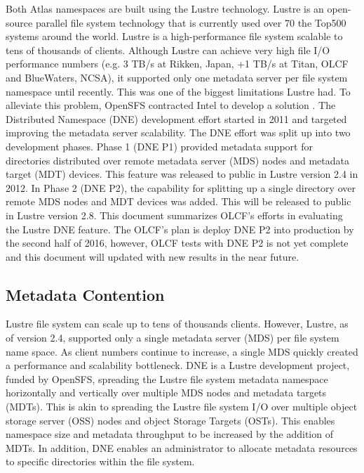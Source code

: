 \documentclass[conference,compsoc]{IEEEtran}
\begin{document}
Both Atlas namespaces are built using the Lustre technology. Lustre is an
open-source parallel file system technology that is currently used over 70%
the Top500 systems around the world. Lustre is a high-performance file system
scalable to tens of thousands of clients. Although Lustre can achieve very high
file I/O performance numbers (e.g. 3 TB/s at Rikken, Japan, +1 TB/s at Titan,
OLCF and BlueWaters, NCSA), it supported only one metadata server per file
system namespace until recently. This was one of the biggest limitations Lustre
had. To alleviate this problem, OpenSFS contracted Intel to develop a solution
\cite{dne-contract}.  The Distributed Namespace (DNE) development effort
started in 2011 and targeted improving the metadata server scalability.  The
DNE effort was split up into two development phases.  Phase 1 (DNE P1) provided
metadata support for directories distributed over remote metadata server (MDS)
nodes and metadata target (MDT) devices. This feature was released to public in
Lustre version 2.4 in 2012. In Phase 2 (DNE P2), the capability for splitting
up a single directory over remote MDS nodes and MDT devices was added. This
will be released to public in Lustre version 2.8.  This document summarizes
OLCF’s efforts in evaluating the Lustre DNE feature. The OLCF’s plan is deploy
DNE P2 into production by the second half of 2016, however, OLCF tests with DNE
P2 is not yet complete and this document will updated with new results in the
near future.

\subsection{Metadata Contention}

Lustre file system can scale up to tens of thousands clients. However, Lustre,
as of version 2.4, supported only a single metadata server (MDS) per file
system name space. As client numbers continue to increase, a single MDS quickly
created a performance and scalability bottleneck. DNE is a Lustre development
project, funded by OpenSFS, spreading the Lustre file system metadata namespace
horizontally and vertically over multiple MDS nodes and metadata targets
(MDTs). This is akin to spreading the Lustre file system I/O over multiple
object storage server (OSS) nodes and object Storage Targets (OSTs). This
enables namespace size and metadata throughput to be increased by the addition
of MDTs. In addition, DNE enables an administrator to allocate metadata
resources to specific directories within the file system. 
\end{document}

